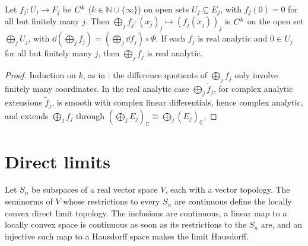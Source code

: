 \begin{theorem}
  \label{thm:ds-calculus}
  \leanok
  Let $f_j \colon U_j \to F_j$ be $C^{k}$ ($k \in \mathbb{N} \cup \{\infty\}$) on open sets
  $U_j \subseteq E_j$, with $f_j(0) = 0$ for all but finitely many $j$. Then
  $\bigoplus_j f_j \colon (x_j)_j \mapsto (f_j(x_j))_j$ is $C^{k}$ on the open set
  $\bigoplus_j U_j$, with $\dd(\bigoplus_j f_j) = (\bigoplus_j \dd f_j) \circ \Phi$. If each $f_j$
  is real analytic and $0 \in U_j$ for all but finitely many $j$, then $\bigoplus_j f_j$ is real
  analytic.
\end{theorem}

\begin{proof}
  \leanok
  Induction on $k$, as in \cite{GN26}: the difference quotients of $\bigoplus_j f_j$ only involve
  finitely many coordinates. In the real analytic case $\bigoplus_j \tilde f_j$, for complex analytic
  extensions $\tilde f_j$, is smooth with complex linear differentials, hence complex analytic, and
  extends $\bigoplus_j f_j$ through $(\bigoplus_j E_j)_{\mathbb{C}} \cong \bigoplus_j (E_j)_{\mathbb{C}}$.
\end{proof}

\section{Direct limits}

\begin{theorem}
  \label{thm:ds-limit}
  \leanok
  Let $S_n$ be subspaces of a real vector space $V$, each with a vector topology. The seminorms of
  $V$ whose restrictions to every $S_n$ are continuous define the locally convex direct limit
  topology. The inclusions are continuous, a linear map to a locally convex space is continuous as
  soon as its restrictions to the $S_n$ are, and an injective such map to a Hausdorff space makes the
  limit Hausdorff.
\end{theorem}


